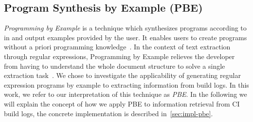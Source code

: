 \documentclass[\myrootdir/main.tex]{subfiles}
\begin{document}




\subsection{Program Synthesis by Example (PBE)}
\label{sec:expl-pbe}
\emph{Programming by Example} is a technique which synthesizes programs according to in and output examples provided by the user.
It enables users to create programs without a priori programming knowledge~\cite{mayer2015user}.
In the context of text extraction through regular expressions, Programming by Example relieves the developer from having to understand the whole document structure to solve a single extraction task~\cite{le2014flashextract:}.
We chose to investigate the applicability of generating regular expression programs by example to extracting information from build logs.
In this work, we refer to our interpretation of this technique as \emph{PBE}.
In the following we will explain the concept of how we apply PBE to information retrieval from CI build logs, the concrete implementation is described in~\ref{sec:impl-pbe}.
\end{document}
